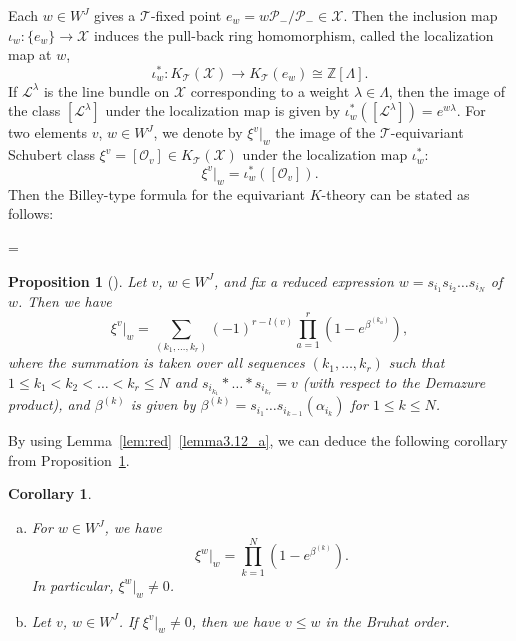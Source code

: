 \documentclass[10pt]{amsart}
\newtheorem{prop}[theo]{Proposition}
\newtheorem{coro}[theo]{Corollary}
\theoremstyle{definition}
\theoremstyle{remark}
\newcommand\Int{\mathbb{Z}}
\newcommand\LL{\mathcal{L}}
\newcommand\OO{\mathcal{O}}
\newcommand\PP{\mathcal{P}}
\newcommand\TT{\mathcal{T}}
\newcommand\XX{\mathcal{X}}
\begin{document}
Each $w \in W^J$ gives a $\TT$-fixed point $e_w = w \PP_-/\PP_- \in \XX$.
Then the inclusion map $\iota_w : \{ e_w \} \to \XX$ induces the pull-back ring homomorphism, 
called the localization map at $w$,
$$
\iota_w^* : K_{\TT}(\XX) \to K_{\TT}(e_w) \cong \Int[\Lambda].
$$
If $\LL^\lambda$ is the line bundle on $\XX$ corresponding to a weight $\lambda \in \Lambda$, 
then the image of the class $[\LL^\lambda]$ under the localization map is given by
$\iota_w^*( [\LL^\lambda] ) = e^{w \lambda}$.
For two elements $v$, $w \in W^J$, we denote by $\xi^v|_w$ 
the image of the $\TT$-equivariant Schubert class $\xi^v = [\OO_v] \in K_{\TT}(\XX)$ 
under the localization map $\iota_w^*$:
$$
\xi^v|_w = \iota_w^* ( [\OO_v] ).
$$
Then the Billey-type formula for the equivariant $K$-theory can be stated as follows:

\setbox\toto=\hbox {\cite[Proposition~2.10]{LSS}}
\begin{prop}[\box\toto]
\label{prop:Billey}
Let $v$, $w \in W^J$, and fix a reduced expression $w = s_{i_1} s_{i_2} \dots s_{i_N}$ of $w$.
Then we have
\begin{equation}
\label{eq:Billey}
\xi^v|_w 
 =
\sum_{(k_1, \dots, k_r)}
 (-1)^{r-l(v)} \prod_{a=1}^r \left( 1 - e^{\beta^{(k_a)}} \right),
\end{equation}
where the summation is taken over all sequences $(k_1, \dots, k_r)$ 
such that $1 \le k_1 < k_2 < \dots < k_r \le N$ and $s_{i_{k_1}} * \dots * s_{i_{k_r}} = v$ 
(with respect to the Demazure product), 
and $\beta^{(k)}$ is given by $\beta^{(k)} = s_{i_1} \dots s_{i_{k-1}}(\alpha_{i_k})$ for $1 \le k \le N$.
\end{prop}

By using Lemma~\ref{lem:red}~\ref{lemma3.12_a}, we can deduce the following corollary from Proposition~\ref{prop:Billey}.

\begin{coro} \label{cor:Billey}\ 

\begin{enumerate}[(a)]
\item\label{coro4.2_a} %
For $w \in W^J$, we have
\begin{equation}
\label{eq:Billey2}
\xi^w|_w = \prod_{k=1}^N \left( 1 - e^{\beta^{(k)}} \right).
\end{equation}
In particular, $\xi^w|_w \neq 0$.
\item\label{coro4.2_b} %
Let $v$, $w \in W^J$.
If $\xi^v|_w \neq 0$, then we have $v \le w$ in the Bruhat order.
\end{enumerate}
\end{coro}
\end{document}
